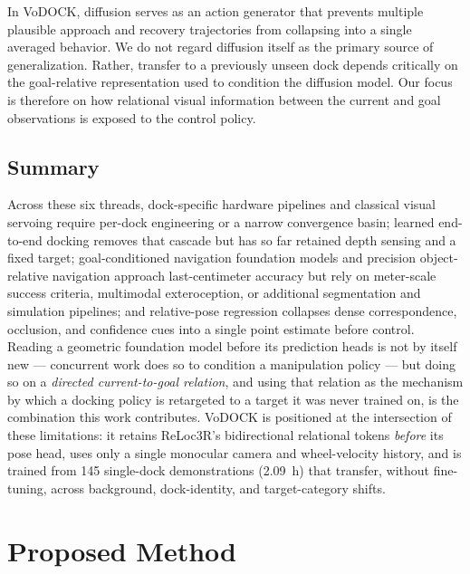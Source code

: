 \documentclass[letterpaper, 10 pt, conference]{IEEEtran}  %
\begin{document}
In VoDOCK, diffusion serves as an action generator that prevents multiple plausible approach and recovery trajectories from collapsing into a single averaged behavior. We do not regard diffusion itself as the primary source of generalization. Rather, transfer to a previously unseen dock depends critically on the goal-relative representation used to condition the diffusion model. Our focus is therefore on how relational visual information between the current and goal observations is exposed to the control policy.

\subsection{Summary}
Across these six threads, dock-specific hardware pipelines and classical visual servoing require per-dock engineering or a narrow convergence basin; learned end-to-end docking removes that cascade but has so far retained depth sensing and a fixed target; goal-conditioned navigation foundation models and precision object-relative navigation approach last-centimeter accuracy but rely on meter-scale success criteria, multimodal exteroception, or additional segmentation and simulation pipelines; and relative-pose regression collapses dense correspondence, occlusion, and confidence cues into a single point estimate before control. Reading a geometric foundation model before its prediction heads is not by itself new --- concurrent work does so to condition a manipulation policy --- but doing so on a \emph{directed current-to-goal relation}, and using that relation as the mechanism by which a docking policy is retargeted to a target it was never trained on, is the combination this work contributes. VoDOCK is positioned at the intersection of these limitations: it retains ReLoc3R's bidirectional relational tokens \emph{before} its pose head, uses only a single monocular camera and wheel-velocity history, and is trained from 145 single-dock demonstrations (2.09~h) that transfer, without fine-tuning, across background, dock-identity, and target-category shifts.


\section{Proposed Method}
\label{sec:method}
\end{document}
